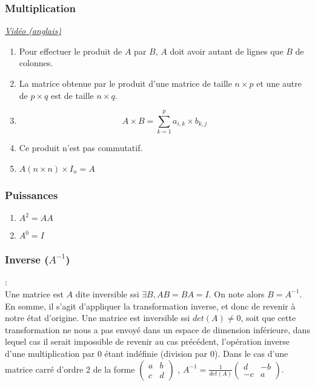 \documentclass{article}
\begin{document}
\subsubsection{Multiplication}
\href{https://youtu.be/XkY2DOUCWMU}{\underline{\textit{Vidéo (anglais)}}}\\
\break
\begin{enumerate}
	\item Pour effectuer le produit de $A$ par $B$, $A$ doit avoir autant de lignes que $B$ de colonnes.
	\item La matrice obtenue par le produit d'une matrice de taille $n \times p$ et une autre de $p \times q$ est de taille $n \times q$.
	\item $$A\times B=\sum_{k=1}^{p} a_{i,k} \times b_{k,j}$$
	\item Ce produit n'est pas commutatif.
	\item $A(n\times n) \times I_n = A$
\end{enumerate}
\subsubsection{Puissances}
\begin{enumerate}
	\item $A^2 = AA$
	\item $A^0 = I$
\end{enumerate}
\subsubsection{Inverse ($A^{-1}$)}:\\
Une matrice est $A$ dite inversible ssi $\exists B, AB = BA = I$. On note alors $B = A^{-1}$. En somme, il s'agit d'appliquer la transformation inverse, et donc de revenir à notre état d'origine. Une matrice est inversible ssi $det(A) \ne 0$, soit que cette transformation ne nous a pas envoyé dans un espace de dimension inférieure, dans lequel cas il serait impossible de revenir au cas précédent, l'opération inverse d'une multiplication par $0$ étant indéfinie (division par $0$).
\break
Dans le cas d'une matrice carré d'ordre 2 de la forme
$\begin{pmatrix}
	a & b \\
	c & d 
\end{pmatrix}$
, $A^{-1} = \frac{1}{det(A)}
\begin{pmatrix}
	d  & -b \\
	-c & a  
\end{pmatrix}$.
\end{document}
